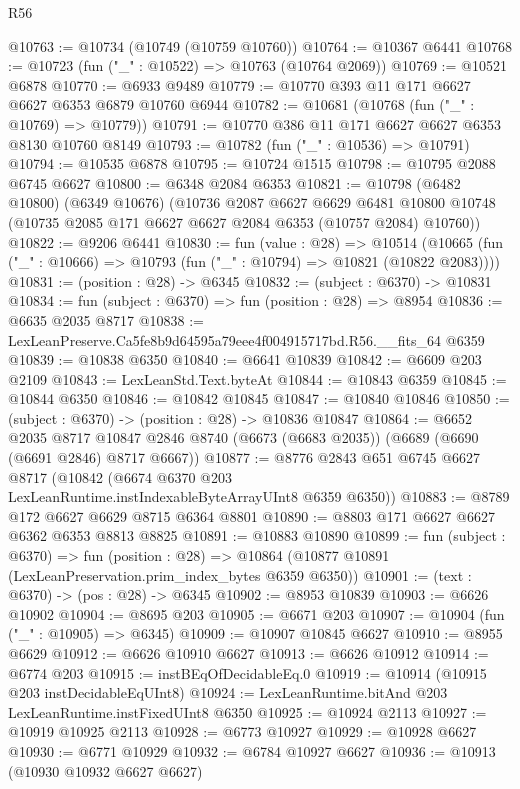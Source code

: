 \begin{lexlean}{R56}
\begin{coremodule}
@10763 := @10734 (@10749 (@10759 @10760))
@10764 := @10367 @6441
@10768 := @10723 (fun ("_" : @10522) => @10763 (@10764 @2069))
@10769 := @10521 @6878
@10770 := @6933 @9489
@10779 := @10770 @393 @11 @171 @6627 @6627 @6353 @6879 @10760 @6944
@10782 := @10681 (@10768 (fun ("_" : @10769) => @10779))
@10791 := @10770 @386 @11 @171 @6627 @6627 @6353 @8130 @10760 @8149
@10793 := @10782 (fun ("_" : @10536) => @10791)
@10794 := @10535 @6878
@10795 := @10724 @1515
@10798 := @10795 @2088 @6745 @6627
@10800 := @6348 @2084 @6353
@10821 := @10798
    (@6482 @10800)
    (@6349 @10676)
    (@10736
      @2087
      @6627
      @6629
      @6481
      @10800
      @10748
      (@10735 @2085 @171 @6627 @6627 @2084 @6353 (@10757 @2084) @10760))
@10822 := @9206 @6441
@10830 := fun (value : @28) =>
  @10514 (@10665 (fun ("_" : @10666) => @10793 (fun ("_" : @10794) => @10821 (@10822 @2083))))
@10831 := (position : @28) -> @6345
@10832 := (subject : @6370) -> @10831
@10834 := fun (subject : @6370) => fun (position : @28) => @8954
@10836 := @6635 @2035 @8717
@10838 := LexLeanPreserve.Ca5fe8b9d64595a79eee4f004915717bd.R56.__fits_64 @6359
@10839 := @10838 @6350
@10840 := @6641 @10839
@10842 := @6609 @203 @2109
@10843 := LexLeanStd.Text.byteAt
@10844 := @10843 @6359
@10845 := @10844 @6350
@10846 := @10842 @10845
@10847 := @10840 @10846
@10850 := (subject : @6370) -> (position : @28) -> @10836 @10847
@10864 := @6652
    @2035
    @8717
    @10847
    @2846
    @8740
    (@6673 (@6683 @2035))
    (@6689 (@6690 (@6691 @2846) @8717 @6667))
@10877 := @8776
    @2843
    @651
    @6745
    @6627
    @8717
    (@10842 (@6674 @6370 @203 LexLeanRuntime.instIndexableByteArrayUInt8 @6359 @6350))
@10883 := @8789 @172 @6627 @6629 @8715 @6364 @8801
@10890 := @8803 @171 @6627 @6627 @6362 @6353 @8813 @8825
@10891 := @10883 @10890
@10899 := fun (subject : @6370) =>
  fun (position : @28) => @10864 (@10877 @10891 (LexLeanPreservation.prim_index_bytes @6359 @6350))
@10901 := (text : @6370) -> (pos : @28) -> @6345
@10902 := @8953 @10839
@10903 := @6626 @10902
@10904 := @8695 @203
@10905 := @6671 @203
@10907 := @10904 (fun ("_" : @10905) => @6345)
@10909 := @10907 @10845 @6627
@10910 := @8955 @6629
@10912 := @6626 @10910 @6627
@10913 := @6626 @10912
@10914 := @6774 @203
@10915 := instBEqOfDecidableEq.{0}
@10919 := @10914 (@10915 @203 instDecidableEqUInt8)
@10924 := LexLeanRuntime.bitAnd @203 LexLeanRuntime.instFixedUInt8 @6350
@10925 := @10924 @2113
@10927 := @10919 @10925 @2113
@10928 := @6773 @10927
@10929 := @10928 @6627
@10930 := @6771 @10929
@10932 := @6784 @10927 @6627
@10936 := @10913 (@10930 @10932 @6627 @6627)

\end{coremodule}
\end{lexlean}
